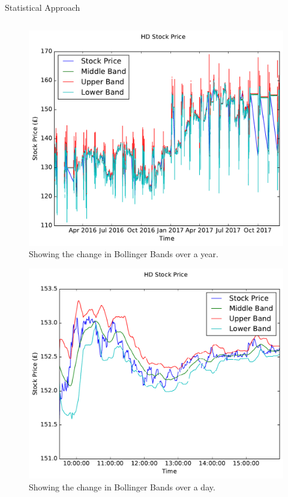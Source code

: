 \documentclass[final]{beamer}
\begin{document}
\begin{frame}{}
\begin{columns}[t]
\begin{column}{.48\linewidth}
\begin{block}{Statistical Approach}
\begin{columns}[t]
         \begin{column}{0.48\linewidth}
         
         \begin{figure}[h!]
         \centering
         \includegraphics[width=0.95\columnwidth]{../HDYearBollinger.pdf}
         \caption{Showing the change in Bollinger Bands over a year.}
         \label{fig: HDYearBollinger}
         \end{figure}
         
         \begin{figure}[h!]
         \centering
         \includegraphics[width=0.95\columnwidth]{../HDDayBollinger.pdf}
         \caption{Showing the change in Bollinger Bands over a day.}
         \label{fig: HDDayBollinger}
         \end{figure}
         

\end{column}
\end{columns}
\end{block}
\end{column}
\end{columns}
\end{frame}
\end{document}
